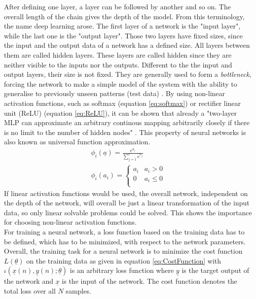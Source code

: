 \documentclass[12pt,DIV14,BCOR12mm,a4paper,footexclude,headinclude,halfparskip-,twoside,openright,cleardoubleempty,idxtotoc,bibtotoc,listtotoc]{scrreprt} %
\numberwithin{equation}{chapter}
\begin{document}
After defining one layer, a layer can be followed by another and so on. The overall length of the chain gives the depth of the model. From this terminology, the name deep learning arose. The first layer of a network is the "input layer", while the last one is the "output layer". Those two layers have fixed sizes, since the input and the output data of a network has a defined size. All layers between them are called hidden layers. These layers are called hidden since they are neither visible to the inputs nor the outputs. Different to the the input and output layers, their size is not fixed. They are generally used to form a \textit{bottleneck}, forcing the network to make a simple model of the system with the ability to generalise to previously unseen patterns (test data) \cite{Michie-et-al-1994}. By using non-linear activation functions, such as softmax (equation \ref{eq:softmax}) or rectifier linear unit (ReLU) (equation \ref{eq:ReLU}), it can be shown that already a "two-layer MLP can approximate an arbitrary continous mapping arbitrarily closely if there is no limit to the number of hidden nodes" \cite{Michie-et-al-1994}. This property of neural networks is also known as universal function approximation.
\begin{align}
	\phi_{i}(\underline{a}) = \frac{e^{a_{i}}}{\sum_{j=1}^{c}e^{a_{j}}} \label{eq:softmax}\\
	\phi_{i}(a_{i}) = \begin{cases} a_i & a_{i} > 0\\0 & a_{i} \leq 0\\ \end{cases} \label{eq:ReLU}
\end{align}
If linear activation functions would be used, the overall network, independent on the depth of the network, will overall be just a linear transformation of the input data, so only linear solvable problems could be solved. This shows the importance for choosing non-linear activation functions.\\
For training a neural network, a loss function based on the training data has to be defined, which has to be minimized, with respect to the network parameters. 
Overall, the training task for a neural network is to minimize the cost function $L(\underline{\theta})$ on the training data as given in equation \ref{eq:CostFunction} with $\iota(\underline{x}(n),\underline{y}(n);\underline{\theta})$ is an arbitrary loss function where $\underline{y}$ is the target output of the network and $\underline{x}$ is the input of the network. The cost function denotes the total loss over all $N$ samples.
\end{document}
